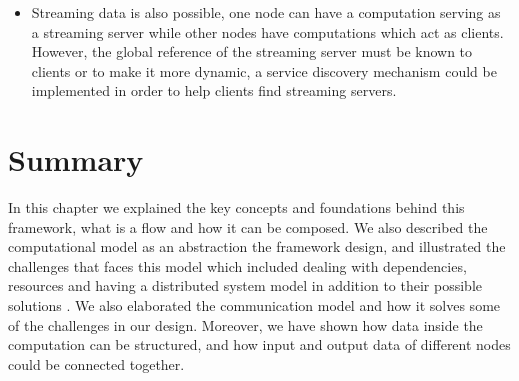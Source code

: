 \begin{itemize}
	\item Streaming data is also possible, one node can have a computation serving as a streaming server while other nodes have computations which act as clients. However, the global reference of the streaming server must be known to clients or to make it more dynamic, a service discovery mechanism could be implemented in order to help clients find streaming servers.
\end{itemize}	


\section{Summary}

In this chapter we explained the key concepts and foundations behind this framework, what is a flow and how it can be composed. We also described the computational model as an abstraction the framework design, and illustrated the challenges that faces this model which included  dealing with dependencies, resources and having a distributed system model in addition to their possible solutions . We also elaborated the communication model and how it solves some of the challenges in our design. Moreover, we have shown how data inside the computation can be structured, and how input and output data of different nodes could be connected together.


